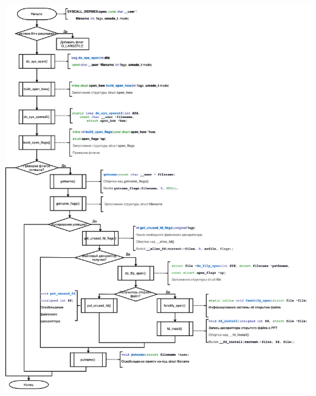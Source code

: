 \documentclass[12pt]{report}
\begin{document}
\begin{center}
		\includegraphics[scale=0.95]{pics/part1.png}
\end{center}
\end{document}
